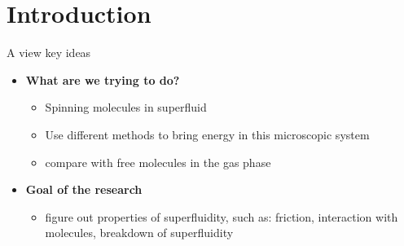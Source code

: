 \section{Introduction}

\begin{frame}{A view key ideas}
  \begin{itemize}
    \item \textbf{What are we trying to do?}
    \begin{itemize}
      \item Spinning molecules in superfluid 
      \item Use different methods to bring energy in this microscopic system
      \item compare with free molecules in the gas phase
    \end{itemize}
    \item \textbf{Goal of the research}
    \begin{itemize}
      \item figure out properties of superfluidity, such as: friction, interaction with molecules, breakdown of superfluidity 
    \end{itemize}
  \end{itemize}
\end{frame}
